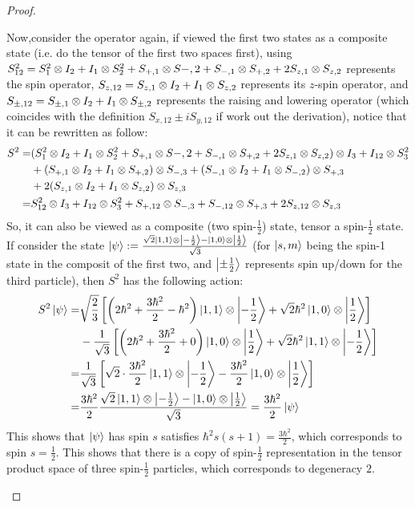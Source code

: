 \documentclass{article}
\begin{document}
\begin{proof}
\begin{itemize}
        Now,consider the operator again, if viewed the first two states as a composite state (i.e. do the tensor of the first two spaces first), using $S_{12}^2 = S_1^2\otimes I_2+I_1\otimes S_2^2 + S_{+,1}\otimes S{-,2}+S_{-,1}\otimes S_{+,2}+2 S_{z,1}\otimes S_{z,2}$ represents the spin operator, $S_{z,12}=S_{z,1}\otimes I_2+I_1 \otimes S_{z,2}$ represents its $z$-spin operator, and $S_{\pm,12}= S_{\pm,1}\otimes I_2+I_1 \otimes S_{\pm,2}$ represents the raising and lowering operator (which coincides with the definition $S_{x,12}\pm iS_{y,12}$ if work out the derivation), notice that it can be rewritten as follow:
        \begin{align}
            S^2 =& (S_1^2\otimes I_2+I_1\otimes S_2^2 + S_{+,1}\otimes S{-,2}+S_{-,1}\otimes S_{+,2}+2 S_{z,1}\otimes S_{z,2})\otimes I_3 + I_{12}\otimes S_3^2\\
            &+ (S_{+,1}\otimes I_2+I_1\otimes S_{+,2})\otimes S_{-,3}+(S_{-,1}\otimes I_2+I_1\otimes S_{-,2})\otimes S_{+,3}\\
            &+2(S_{z,1}\otimes I_2+I_1\otimes S_{z,2})\otimes S_{z,3}\\
            =& S_{12}^2\otimes I_3+I_{12}\otimes S_3^2 + S_{+,12}\otimes S_{-,3}+S_{-,12}\otimes S_{+,3} + 2S_{z,12}\otimes S_{z,3}
        \end{align}
        So, it can also be viewed as a composite (two spin-$\frac{1}{2}$) state, tensor a spin-$\frac{1}{2}$ state. If consider the state $\ket{\psi}:=\frac{\sqrt{2}\ket{1,1}\otimes \ket{-\frac{1}{2}}-\ket{1,0}\otimes \ket{\frac{1}{2}}}{\sqrt{3}}$ (for $\ket{s,m}$ being the spin-1 state in the composit of the first two, and $\ket{\pm \frac{1}{2}}$ represents spin up/down for the third particle), then $S^2$ has the following action:
        \begin{align}
            S^2\ket{\psi} =& \sqrt{\frac{2}{3}}\left[\left(2\hbar^2+\frac{3\hbar^2}{2}-\hbar^2\right)\ket{1,1}\otimes\ket{-\frac{1}{2}} + \sqrt{2}\hbar^2\ket{1,0}\otimes \ket{\frac{1}{2}}\right]\\
            &- \frac{1}{\sqrt{3}}\left[\left(2\hbar^2+\frac{3\hbar^2}{2}+0\right)\ket{1,0}\otimes\ket{\frac{1}{2}} + \sqrt{2}\hbar^2\ket{1,1}\otimes\ket{-\frac{1}{2}}\right]\\
            =& \frac{1}{\sqrt{3}}\left[\sqrt{2}\cdot\frac{3\hbar^2}{2}\ket{1,1}\otimes\ket{-\frac{1}{2}}-\frac{3\hbar^2}{2}\ket{1,0}\otimes\ket{\frac{1}{2}}\right]\\
            =& \frac{3\hbar^2}{2}\frac{\sqrt{2}\ket{1,1}\otimes\ket{-\frac{1}{2}}-\ket{1,0}\otimes\ket{\frac{1}{2}}}{\sqrt{3}}= \frac{3\hbar^2}{2}\ket{\psi}
        \end{align}
        This shows that $\ket{\psi}$ has spin $s$ satisfies $\hbar^2 s(s+1)=\frac{3\hbar^2}{2}$, which corresponds to spin $s=\frac{1}{2}$.
        This shows that there is a copy of spin-$\frac{1}{2}$ representation in the tensor product space of three spin-$\frac{1}{2}$ particles, which corresponds to degeneracy $2$.


\end{itemize}
\end{proof}
\end{document}
